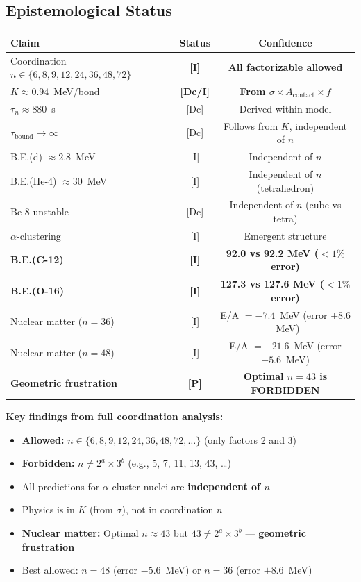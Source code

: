 \subsection{Epistemological Status}
\label{subsec:m6-epistemology}

\begin{center}
\begin{tabular}{lcc}
\hline
\textbf{Claim} & \textbf{Status} & \textbf{Confidence} \\
\hline
Coordination $n \in \{6,8,9,12,24,36,48,72\}$ & \textbf{[I]} & \textbf{All factorizable allowed} \\
$K \approx 0.94$~MeV/bond & \textbf{[Dc/I]} & \textbf{From $\sigma \times A_{\text{contact}} \times f$} \\
$\tau_n \approx 880$~s & [Dc] & Derived within model \\
$\tau_{\text{bound}} \to \infty$ & [Dc] & Follows from $K$, independent of $n$ \\
B.E.(d) $\approx 2.8$~MeV & [I] & Independent of $n$ \\
B.E.(He-4) $\approx 30$~MeV & [I] & Independent of $n$ (tetrahedron) \\
Be-8 unstable & [Dc] & Independent of $n$ (cube vs tetra) \\
$\alpha$-clustering & [I] & Emergent structure \\
\hline
\textbf{B.E.(C-12)} & \textbf{[I]} & \textbf{92.0 vs 92.2 MeV ($<1\%$ error)} \\
\textbf{B.E.(O-16)} & \textbf{[I]} & \textbf{127.3 vs 127.6 MeV ($<1\%$ error)} \\
\hline
Nuclear matter ($n=36$) & [I] & E/A $= -7.4$~MeV (error $+8.6$~MeV) \\
Nuclear matter ($n=48$) & [I] & E/A $= -21.6$~MeV (error $-5.6$~MeV) \\
\textbf{Geometric frustration} & \textbf{[P]} & \textbf{Optimal $n=43$ is FORBIDDEN} \\
\hline
\end{tabular}
\end{center}

\textbf{Key findings from full coordination analysis:}
\begin{itemize}
    \item \textbf{Allowed:} $n \in \{6, 8, 9, 12, 24, 36, 48, 72, \ldots\}$ (only factors 2 and 3)
    \item \textbf{Forbidden:} $n \neq 2^a \times 3^b$ (e.g., 5, 7, 11, 13, 43, \ldots)
    \item All predictions for $\alpha$-cluster nuclei are \textbf{independent of $n$}
    \item Physics is in $K$ (from $\sigma$), not in coordination $n$
    \item \textbf{Nuclear matter:} Optimal $n \approx 43$ but $43 \neq 2^a \times 3^b$ --- \textbf{geometric frustration}
    \item Best allowed: $n = 48$ (error $-5.6$~MeV) or $n = 36$ (error $+8.6$~MeV)
\end{itemize}

